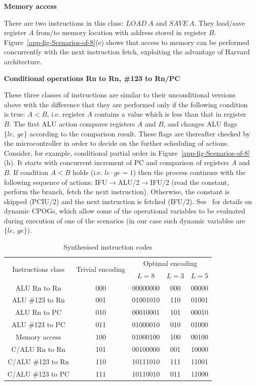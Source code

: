 \textbf{Memory access}

There are two instructions in this class: $\mathit{LOAD\ A}$ and
$\mathit{SAVE\ A}$. They load/save register $A$ from/to memory location
with address stored in register $B$. Figure~\ref{app-fig-Scenarios-of-8}(e)
shows that access to memory can be performed concurrently with the
next instruction fetch, exploiting the advantage of Harvard architecture.

\textbf{Conditional operations Rn to Rn, \#123 to Rn/PC}

These three classes of instructions are similar to their unconditional
versions above with the difference that they are performed only if
the following condition is true: $A<B$, i.e. register $A$ contains
a value which is less than that in register $B$. The first ALU action
compares registers $A$ and $B$, and changes ALU flags $\{le,\ ge\}$
according to the comparison result. These flags are thereafter checked
by the microcontroller in order to decide on the further scheduling
of actions. Consider, for example, conditional partial order in Figure~\ref{app-fig-Scenarios-of-8}(h).
It starts with concurrent increment of PC and comparison of registers
$A$ and $B$. If condition $A<B$ holds (i.e. $le\cdot\overline{ge}=1$)
then the process continues with the following sequence of actions:
IFU$\rightarrow$ALU/2$\rightarrow$IFU/2 (read the constant, perform
the branch, fetch the next instruction). Otherwise, the constant is
skipped (PCIU/2) and the next instruction is fetched (IFU/2). See~\cite{2009_mokhov_phd}
for details on dynamic CPOGs, which allow some of the operational
variables to be evaluated during execution of one of the scenarios
(in our case such dynamic variables are $\{le,\ ge\}$).

\begin{table}[h]
\centering

\begin{tabular}{|c||c|c|c|c|}
\hline 
\multirow{2}{*}{Instructions class} & 
\multirow{2}{*}{Trivial encoding} & 
\multicolumn{3}{c|}{ Optimal encoding} \tabularnewline
\cline{3-5}
& & $L=8$ & {$L=3$} & {$L=5$} \tabularnewline
\hline 
\hline 
{ ALU Rn to Rn} & { 000} & { 00000000} & { 000} & { 00000}\tabularnewline
\hline 
{ ALU \#123 to Rn} & { 001} & { 01001010} & { 110} & { 01001}\tabularnewline
\hline 
{ ALU Rn to PC} & { 010} & { 00010001} & { 101} & { 00010}\tabularnewline
\hline 
{ ALU \#123 to PC} & { 011} & { 01000010} & { 010} & { 01000}\tabularnewline
\hline 
{ Memory access} & { 100} & { 01000100} & { 100} & { 00100}\tabularnewline
\hline 
{ C/ALU Rn to Rn} & { 101} & { 00100000} & { 001} & { 10000}\tabularnewline
\hline 
{ C/ALU \#123 to Rn} & { 110} & { 10111010} & { 111} & { 11001}\tabularnewline
\hline 
{ C/ALU \#123 to PC} & { 111} & { 10110010} & { 011} & { 11000}\tabularnewline
\hline 
\end{tabular}

\caption{Synthesised instruction codes\label{tab:Synthesised-instruction-codes}}
\end{table}


